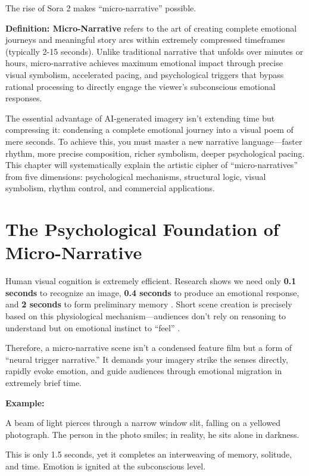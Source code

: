 The rise of Sora 2 makes ``micro-narrative'' possible.

\begin{Prompt}
\textbf{Definition: Micro-Narrative} refers to the art of creating complete emotional journeys and meaningful story arcs within extremely compressed timeframes (typically 2-15 seconds). Unlike traditional narrative that unfolds over minutes or hours, micro-narrative achieves maximum emotional impact through precise visual symbolism, accelerated pacing, and psychological triggers that bypass rational processing to directly engage the viewer's subconscious emotional responses.
\end{Prompt}

The essential advantage of AI-generated imagery isn't extending time but compressing it: condensing a complete emotional journey into a visual poem of mere seconds. To achieve this, you must master a new narrative language—faster rhythm, more precise composition, richer symbolism, deeper psychological pacing. This chapter will systematically explain the artistic cipher of ``micro-narratives'' from five dimensions: psychological mechanisms, structural logic, visual symbolism, rhythm control, and commercial applications.

\section{The Psychological Foundation of Micro-Narrative}
\label{sec:psychological-foundation}

Human visual cognition is extremely efficient. Research shows we need only \textbf{0.1 seconds} to recognize an image, \textbf{0.4 seconds} to produce an emotional response, and \textbf{2 seconds} to form preliminary memory \citep{cutting2005perceiving}. Short scene creation is precisely based on this physiological mechanism—audiences don't rely on reasoning to understand but on emotional instinct to ``feel'' \citep{kahneman2011thinking}.

Therefore, a micro-narrative scene isn't a condensed feature film but a form of ``neural trigger narrative.'' It demands your imagery strike the senses directly, rapidly evoke emotion, and guide audiences through emotional migration in extremely brief time.

\textbf{Example:}

\begin{Prompt}
A beam of light pierces through a narrow window slit, falling on a yellowed photograph. The person in the photo smiles; in reality, he sits alone in darkness.

This is only 1.5 seconds, yet it completes an interweaving of memory, solitude, and time. Emotion is ignited at the subconscious level.
\end{Prompt}

